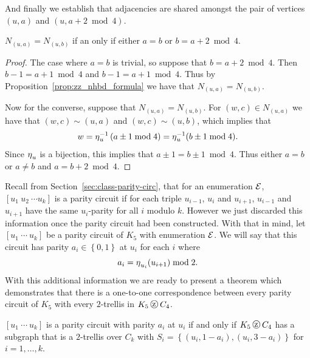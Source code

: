 \noindent
And finally we establish that adjacencies are shared amongst the pair of vertices $(u,a)$ and $(u,a+2\bmod{4})$. 

\begin{proposition}
\label{prop:slice}
$N_{\left(u,a \right)} = N_{\left(u,b\right)}$ if an only if either $a = b$ or $b = a + 2 \bmod{4}$. 
\end{proposition}
\begin{proof}

The case where $a=b$ is trivial, so suppose that $b = a +2\bmod{4}$. Then $b - 1 = a + 1 \bmod{4}$ and $b -1 = a + 1 \bmod{4}$. Thus by Proposition~\ref{prop:zz_nhbd_formula} we have that $N_{(u,a)} = N_{(u,b)}$. 

Now for the converse, suppose that $N_{\left(u,a \right)} = N_{\left(u,b\right)}$. For $\left(w,c\right) \in N_{\left(u,a\right)}$ we have that $(w,c) \sim (u,a)$ and $(w,c) \sim (u,b)$, which implies that \[ w = \operatorname{\eta}_{u}^{-1}\left(a \pm 1 \bmod{4} \right) = \operatorname{\eta}_{u}^{-1}(b \pm 1 \bmod{4}).\] Since $\operatorname{\eta}_{u}$ is a bijection, this implies that $ a \pm 1 = b \pm 1 \bmod{4}$. Thus either $a=b$ or $a \neq b$ and $a = b + 2 \bmod{4}$.
\end{proof}

Recall from Section~\ref{sec:class-parity-circ}, that for an enumeration $\operatorname{\mathcal{E}}$, $\left[u_1\ u_2\  \cdots u_k\right]$ is a parity circuit if for each triple $u_{i-1}$, $u_{i}$ and $u_{i+1}$, $u_{i-1}$ and $u_{i+1}$ have the same $u_{i}$-parity for all $i$ modulo $k$. However we just discarded this information once the parity circuit had been constructed. With that in mind, let $\left[u_1\ \cdots\ u_k\right]$ be a parity circuit of $K_5$ with enumeration $\operatorname{\mathcal{E}}$. We will say that this circuit has parity $a_i \in \left\{0,1 \right\}$ at $u_i$ for each $i$ where \[ a_i = \operatorname{\eta}_{u_i}(u_{i+1}) \bmod{2}.    \] With this additional information we are ready to present a theorem which demonstrates that there is a one-to-one correspondence between every parity circuit of $K_5$ with every $2$-trellis in $K_5 \zigzag C_4$. 

\begin{theorem}
\label{thm:zzcorrespondence}
$\left[u_1\  \cdots\  u_k\right]$ is a parity circuit with parity $a_i$ at $u_i$ if and only if $K_5 \zigzag C_4$ has a subgraph that is a  $2$-trellis over $C_k$ with $S_i = \left\{ (u_i, 1-a_i), (u_i, 3-a_i)\right\}$ for $i =1,\ldots,k$.
\end{theorem}

